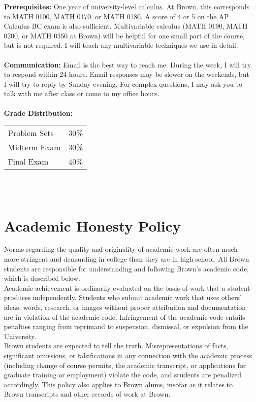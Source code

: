 \documentclass[11pt]{article}
\begin{document}
\textbf {Prerequisites:} One year of university-level calculus. At Brown, this corresponds to MATH 0100, MATH 0170, or MATH 0180. A score of 4 or 5 on the AP Calculus BC exam is also sufficient. Multivariable calculus (MATH 0190, MATH 0200, or MATH 0350 at Brown) will be helpful for one small part of the course, but is not required. I will teach any multivariable techniques we use in detail.\\\\
\textbf{Communication: }Email is the best way to reach me. During the week, I will try to respond within 24 hours. Email responses may be slower on the weekends, but I will try to reply by Sunday evening. For complex questions, I may ask you to talk with me after class or come to my office hours.
 \\\\
\textbf {Grade Distribution:} \\
\hspace*{40mm}
\begin{tabular}{ l l }
Problem Sets & 30\% \\
Midterm Exam  & 30\% \\
Final Exam  & 40\%
\end{tabular} \\\\



\section*{Academic Honesty Policy}
Norms regarding the quality and originality of academic work are often much more stringent and demanding in college than they are in high school. All Brown students are responsible for understanding and following Brown’s academic code, which is described below. \\

Academic achievement is ordinarily evaluated on the basis of work that a student produces independently. Students who submit academic work that uses others’ ideas, words, research, or images without proper attribution and documentation are in violation of the academic code. Infringement of the academic code entails penalties ranging from reprimand to suspension, dismissal, or expulsion from the University. \\

Brown students are expected to tell the truth. Misrepresentations of facts, significant omissions, or falsifications in any connection with the academic process (including change of course permits, the academic transcript, or applications for graduate training or employment) violate the code, and students are penalized accordingly. This policy also applies to Brown alums, insofar as it relates to Brown transcripts and other records of work at Brown. \\
\end{document}
